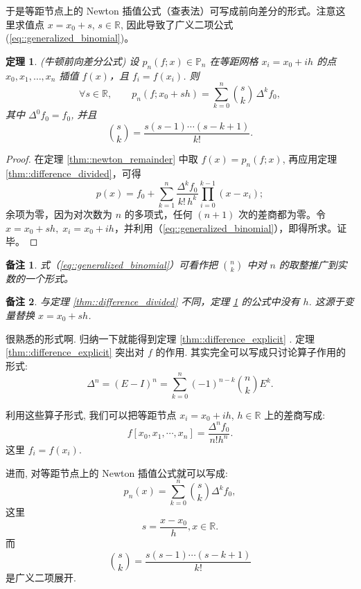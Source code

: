 \documentclass[a4paper]{ctexart}
\newtheorem{theorem}{定理}
\newtheorem{remark}{备注}
\numberwithin{theorem}{section}
\numberwithin{equation}{section}
\numberwithin{figure}{section}
\numberwithin{remark}{section}
\begin{document}
于是等距节点上的 Newton 插值公式（查表法）可写成前向差分的形式。注意这里求值点 $x = x_0 + s$, $s \in \mathbb{R}$, 
因此导致了广义二项公式 (\ref{eq::generalized_binomial})。

\begin{theorem}
    \label{thm::newton_forward}
    (牛顿前向差分公式)
设 $p_n(f;x)\in\mathbb{P}_n$ 在等距网格 $x_i=x_0+ih$ 的点 $x_0,x_1,\ldots,x_n$ 插值 $f(x)$，且 $f_i=f(x_i)$. 则
\begin{equation}
    \label{eq::newton_forward}
\forall s\in\mathbb{R},\qquad
p_n(f;x_0+sh)=\sum_{k=0}^{n}\binom{s}{k}\,\Delta^{k}f_0,
\end{equation}
其中 $\Delta^0 f_0=f_0$, 并且
\begin{equation}
    \label{eq::generalized_binomial}
\binom{s}{k}=\frac{s(s-1)\cdots(s-k+1)}{k!}.
\end{equation}
\end{theorem}
\begin{proof}
在定理 \ref{thm::newton_remainder} 中取 $f(x)=p_n(f;x)$, 再应用定理 \ref{thm::difference_divided}，可得
\begin{equation*}
p(x)=f_0+\sum_{k=1}^{n}\frac{\Delta^{k}f_0}{k!\,h^{k}}
\prod_{i=0}^{k-1}(x-x_i);
\end{equation*}
余项为零，因为对次数为 $n$ 的多项式，任何 $(n+1)$ 次的差商都为零。令
$x=x_0+sh,\; x_i=x_0+ih$，并利用（\ref{eq::generalized_binomial}），即得所求。证毕。
\end{proof}

\begin{remark}
式（\ref{eq::generalized_binomial}）可看作把 $\binom{n}{k}$ 中对 $n$ 的取整推广到实数的一个形式。
\end{remark}

\begin{remark}
与定理 \ref{thm::difference_divided} 不同，定理 \ref{thm::newton_forward} 的公式中没有 $h$. 这源于变量替换 $x=x_0+sh$.
\end{remark}

很熟悉的形式啊. 归纳一下就能得到定理 \ref{thm::difference_explicit} . 定理 \ref{thm::difference_explicit} 突出对 $f$ 的作用.
其实完全可以写成只讨论算子作用的形式:
$$
\Delta^n = (E - I)^n = \sum_{k = 0}^n (-1)^{n - k}{n \choose k}E^k.
$$

利用这些算子形式, 我们可以把等距节点 $x_i = x_0 + ih$, $h \in
\mathbb{R}$ 上的差商写成:
$$
f[x_0, x_1, \cdots, x_n] = \frac{\Delta^n f_0}{n! h^n}.
$$
这里 $f_i = f(x_i)$.

进而, 对等距节点上的 Newton 插值公式就可以写成:
$$
p_n(x) = \sum_{k = 0}^n {s \choose k} \Delta^k f_0,
$$
这里
$$
s = \frac{x - x_0}h, x \in \mathbb{R}.
$$
而
$$
{s \choose k} = \frac{s(s - 1)\cdots(s - k + 1)}{k!}
$$
是广义二项展开.
\end{document}
